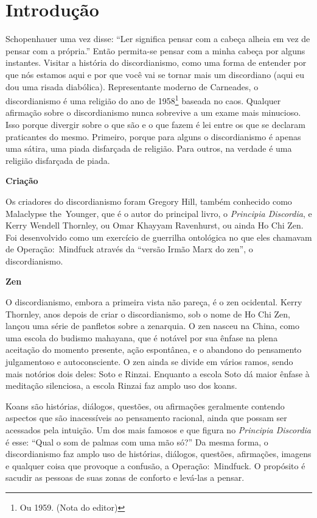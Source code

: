 \newpage
\chapter{Introdução}

Schopenhauer uma vez disse: ``Ler significa pensar com a cabeça alhe\-ia em vez de pensar com a própria.'' Então permita-se pensar com a minha cabeça por alguns instantes. Visitar a história do discordianismo, como uma forma de entender por que nós estamos aqui e por que você vai se tornar mais um discordiano (aqui eu dou uma risada diabólica). Representante moderno de Carneades, o discordianismo é uma religião do ano de 1958\footnote{Ou 1959. (Nota do editor)} baseada no caos. Qualquer afirmação sobre o discordianismo nunca sobrevive a um exame mais minucioso. Isso porque divergir sobre o que são e o que fazem é lei entre os que se declaram praticantes do mesmo. Primeiro, porque para alguns o discordianismo é apenas uma sátira, uma piada disfarçada de religião. Para outros, na verdade é uma religião disfarçada de piada.
 
\begin{flushleft}
{\Large \textbf{Criação}}
\end{flushleft}

\noindent Os criadores do discordianismo foram Gregory Hill, também conhecido como Malaclypse the~Younger, que é o autor do principal livro, o \emph{Principia Discordia}, e Kerry Wendell Thornley, ou Omar Khay\-yam Ravenhurst, ou ainda Ho Chi Zen. Foi desenvolvido como um exercício de guerrilha ontológica no que eles chamavam de Operação:~Mindfuck através da ``versão Irmão Marx do zen'', o discordianismo.

\newpage
\begin{flushleft}
{\Large \textbf{Zen}}
\end{flushleft}

\noindent O discordianismo, embora a primeira vista não pareça, é o zen ocidental. Kerry Thornley, anos depois de criar o discordianismo, sob o nome de Ho Chi Zen, lançou uma série de panfletos sobre a zenarquia. O zen nasceu na China, como uma escola do budismo mahayana, que é notável por sua ênfase na plena aceitação do momento presente, ação espontânea, e o abandono do pensamento julgamentoso e autoconsciente. O zen ainda se divide em vários ramos, sendo mais notórios dois deles: Soto e Rinzai. Enquanto a escola Soto dá maior ênfase à meditação silenciosa, a escola Rinzai faz amplo uso dos koans.

Koans são histórias, diálogos, questões, ou afirmações geralmente contendo aspectos que são inacessíveis ao pensamento racional, ain\-da que possam ser acessados pela intuição. Um dos mais famosos e que figura no \emph{Principia Discordia} é esse: ``Qual o som de palmas com uma mão só?'' Da mesma forma, o discordianismo faz amplo uso de histórias, diálogos, questões, afirmações, imagens e qualquer coisa que provoque a confusão, a Operação:~Mindfuck. O propósito é sacudir as pessoas de suas zonas de conforto e levá-las a pensar.


